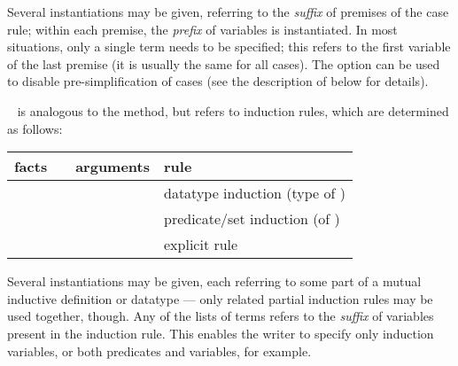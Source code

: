 \begin{isabellebody}
\begin{isamarkuptext}
\begin{description}
  Several instantiations may be given, referring to the \emph{suffix}
  of premises of the case rule; within each premise, the \emph{prefix}
  of variables is instantiated.  In most situations, only a single
  term needs to be specified; this refers to the first variable of the
  last premise (it is usually the same for all cases).  The  option can be used to disable pre-simplification of
  cases (see the description of \hyperlink{method.induct}{\mbox{}} below for details).

  \item \hyperlink{method.induct}{\mbox{}}~ is analogous to the
  \hyperlink{method.cases}{\mbox{}} method, but refers to induction rules, which are
  determined as follows:

  \medskip
  \begin{tabular}{llll}
    facts           &                  & arguments            & rule \\\hline
                    & \hyperlink{method.induct}{\mbox{\isa{induct}}} & \isa{{\isachardoublequote}P\ x{\isachardoublequote}}        & datatype induction (type of \isa{x}) \\
    \isa{{\isachardoublequote}{\isasymturnstile}\ A\ x{\isachardoublequote}} & \hyperlink{method.induct}{\mbox{\isa{induct}}} & \isa{{\isachardoublequote}{\isasymdots}{\isachardoublequote}}          & predicate/set induction (of \isa{A}) \\
    \isa{{\isachardoublequote}{\isasymdots}{\isachardoublequote}}     & \hyperlink{method.induct}{\mbox{\isa{induct}}} & \isa{{\isachardoublequote}{\isasymdots}\ rule{\isacharcolon}\ R{\isachardoublequote}} & explicit rule \isa{R} \\
  \end{tabular}
  \medskip
  
  Several instantiations may be given, each referring to some part of
  a mutual inductive definition or datatype --- only related partial
  induction rules may be used together, though.  Any of the lists of
  terms  refers to the \emph{suffix} of variables
  present in the induction rule.  This enables the writer to specify
  only induction variables, or both predicates and variables, for
  example.


\end{description}
\end{isamarkuptext}
\end{isabellebody}

